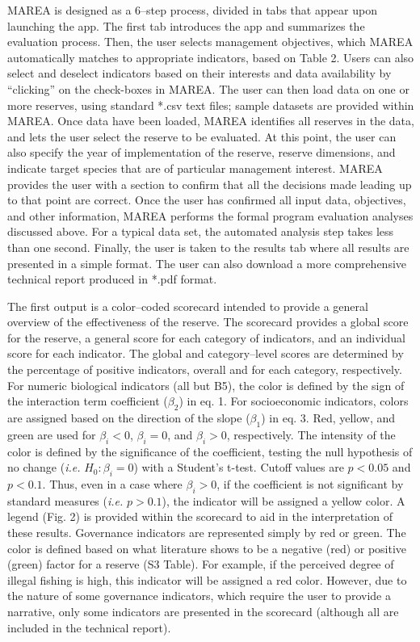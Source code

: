 \documentclass[12pt,]{article}
\begin{document}
MAREA is designed as a 6--step process, divided in tabs that appear upon
launching the app. The first tab introduces the app and summarizes the
evaluation process. Then, the user selects management objectives, which
MAREA automatically matches to appropriate indicators, based on Table 2.
Users can also select and deselect indicators based on their interests
and data availability by ``clicking'' on the check-boxes in MAREA. The
user can then load data on one or more reserves, using standard *.csv
text files; sample datasets are provided within MAREA. Once data have
been loaded, MAREA identifies all reserves in the data, and lets the
user select the reserve to be evaluated. At this point, the user can
also specify the year of implementation of the reserve, reserve
dimensions, and indicate target species that are of particular
management interest. MAREA provides the user with a section to confirm
that all the decisions made leading up to that point are correct. Once
the user has confirmed all input data, objectives, and other
information, MAREA performs the formal program evaluation analyses
discussed above. For a typical data set, the automated analysis step
takes less than one second. Finally, the user is taken to the results
tab where all results are presented in a simple format. The user can
also download a more comprehensive technical report produced in *.pdf
format.

The first output is a color--coded scorecard intended to provide a
general overview of the effectiveness of the reserve. The scorecard
provides a global score for the reserve, a general score for each
category of indicators, and an individual score for each indicator. The
global and category--level scores are determined by the percentage of
positive indicators, overall and for each category, respectively. For
numeric biological indicators (all but B5), the color is defined by the
sign of the interaction term coefficient (\(\beta_2\)) in eq. 1. For
socioeconomic indicators, colors are assigned based on the direction of
the slope (\(\beta_1\)) in eq. 3. Red, yellow, and green are used for
\(\beta_i<0\), \(\beta_i = 0\), and \(\beta_i>0\), respectively. The
intensity of the color is defined by the significance of the
coefficient, testing the null hypothesis of no change (\emph{i.e.}
\(H_0: \beta_i = 0\)) with a Student's t-test. Cutoff values are
\(p < 0.05\) and \(p < 0.1\). Thus, even in a case where
\(\beta_i > 0\), if the coefficient is not significant by standard
measures (\emph{i.e. } \(p>0.1\)), the indicator will be assigned a
yellow color. A legend (Fig. 2) is provided within the scorecard to aid
in the interpretation of these results. Governance indicators are
represented simply by red or green. The color is defined based on what
literature shows to be a negative (red) or positive (green) factor for a
reserve (S3 Table). For example, if the perceived degree of illegal
fishing is high, this indicator will be assigned a red color. However,
due to the nature of some governance indicators, which require the user
to provide a narrative, only some indicators are presented in the
scorecard (although all are included in the technical report).
\end{document}
